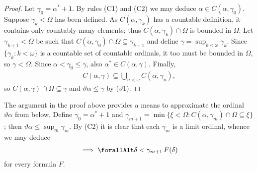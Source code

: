 \documentclass[UKenglish,cleveref,DIV=12]{scrartcl}
\let\forall\forallAlt
\theoremstyle{definition}
\theoremstyle{definition}
\begin{document}
\begin{proof}
 Let $\gamma_0=\alpha^*+1$. By rules (C1) and (C2) we may deduce $\alpha\in C(\alpha,\gamma_0)$. Suppose $\gamma_k<\Omega$ has been defined. As $C(\alpha,\gamma_k)$ has a countable definition, it contains only countably many elements; thus $C(\alpha,\gamma_k)\cap\Omega$ is bounded in $\Omega$. Let $\gamma_{k+1}<\Omega$ be such that $C(\alpha,\gamma_0)\cap\Omega\subseteq\gamma_{k+1}$ and define $\gamma=\sup_{k<\omega}\gamma_k$. Since $\{\gamma_k:k<\omega\}$ is a countable set of countable ordinals, it too must be bounded in $\Omega$, so $\gamma<\Omega$. Since $\alpha<\gamma_0\le\gamma$, also $\alpha^*\in C(\alpha,\gamma)$. Finally,
 \begin{align*}
  C(\alpha,\gamma)\subseteq\bigcup_{n<\omega}C(\alpha,\gamma_n),
 \end{align*}
 so $C(\alpha,\gamma)\cap\Omega\subseteq \gamma$ and $\vartheta\alpha\le\gamma$ by ($\vartheta$1).
\end{proof}

The argument in the proof above provides a means to approximate the ordinal $\vartheta\alpha$ from below. Define $\gamma_0=\alpha^*+1$ and $\gamma_{m+1}=\min\{\xi<\Omega:C(\alpha,\gamma_m)\cap\Omega\subseteq\xi\}$; then $\vartheta\alpha\le\sup_{m}\gamma_m$. By (C2) it is clear that each $\gamma_m$ is a limit ordinal, whence we may deduce
\begin{align*}
 [(\forall\delta\in C(\alpha,\gamma_m)\cap\Omega)\forall\xi<\delta\,F(\xi)]\implies \forall\delta<\gamma_{m+1}\,F(\delta)
\end{align*}
for every formula $F$.
\end{document}
